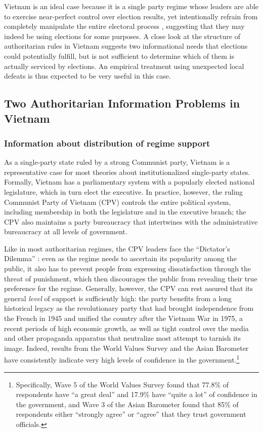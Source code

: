 \documentclass[12pt]{article}
\newcommand{\1}{\mathbbm{1}}
\begin{document}
Vietnam is an ideal case because it is a single party regime whose leaders are able to exercise near-perfect control over election results, yet intentionally refrain from completely manipulate the entire electoral process \citep{MaleskySchuler2011}, suggesting that they may indeed be using elections for some purposes. A close look at the structure of authoritarian rules in Vietnam suggests two informational needs that elections could potentially fulfill, but is not sufficient to determine which of them is actually serviced by elections. An empirical treatment using unexpected local defeats is thus expected to be very useful in this case.

\subsection{Two Authoritarian Information Problems in Vietnam}
\label{sec:vietnam_problems}

\subsubsection{Information about distribution of regime support}

As a single-party state ruled by a strong Communist party, Vietnam is a representative case for most theories about institutionalized single-party states. Formally, Vietnam has a parliamentary system with a popularly elected national legislature, which in turn elect the executive. In practice, however, the ruling Communist Party of Vietnam (CPV) controls the entire political system, including membership in both the legislature and in the executive branch; the CPV also maintains a party bureaucracy that intertwines with the administrative bureaucracy at all levels of government. 

Like in most authoritarian regimes, the CPV leaders face the ``Dictator's Dilemma'' \citep{Wintrobe2000}: even as the regime needs to ascertain its popularity among the public, it also has to prevent people from expressing dissatisfaction through the threat of punishment, which then discourages the public from revealing their true preference for the regime. Generally, however, the CPV can rest assured that its general \textit{level} of support is sufficiently high: the party benefits from a long historical legacy as the revolutionary party that had brought independence from the French in 1945 and unified the country after the Vietnam War in 1975, a recent periods of high economic growth, as well as tight control over the media and other propaganda apparatus that neutralize most attempt to tarnish its image. Indeed, results from the World Values Survey \citeyearpar{wvs} and the Asian Barometer \citeyearpar{abs} have consistently indicate very high levels of confidence in the government.\footnote{Specifically, Wave 5 of the World Values Survey \citeyearpar{wvs} found that 77.8\% of respondents have ``a great deal'' and 17.9\% have ``quite a lot'' of confidence in the government, and Wave 3 of the Asian Barometer \citeyearpar{abs} found that 85\% of respondents either ``strongly agree'' or ``agree'' that they trust government officials.}
\end{document}

